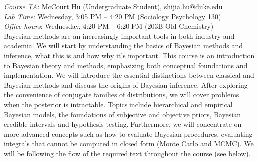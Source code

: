 \documentclass[11pt]{article}
\begin{document}
\emph{Course TA}: McCourt Hu (Undergraduate Student), shijia.hu@duke.edu\\
\emph{Lab Time}: Wednesday, 3:05 PM -- 4:20 PM (Sociology Psychology 130)\\
\emph{Office hours}: Wednesday, 4:20 PM -- 6:20 PM (203B Old Chemistry)\\

Bayesian methods are an increasingly important tools
in both industry and academia. We will start by understanding the basics of Bayesian methods and inference, what this is and how why it's important. 
This course is an introduction to Bayesian theory and methods, emphasizing both conceptual foundations and implementation. We will introduce the essential distinctions between classical and Bayesian methods and discuss the origins of Bayesian inference. After exploring the convenience of conjugate families of distributions, we will cover problems when the posterior is intractable. Topics include hierarchical and empirical Bayesian models, the foundations of subjective and objective priors, Bayesian credible intervals and hypothesis testing. Furthermore, we 
will  concentrate on more advanced concepts such as how to evaluate Bayesian procedures, evaluating integrals that cannot be computed in closed form (Monte Carlo and MCMC). We will be following the flow of the required text throughout the course (see below). \\
\end{document}
